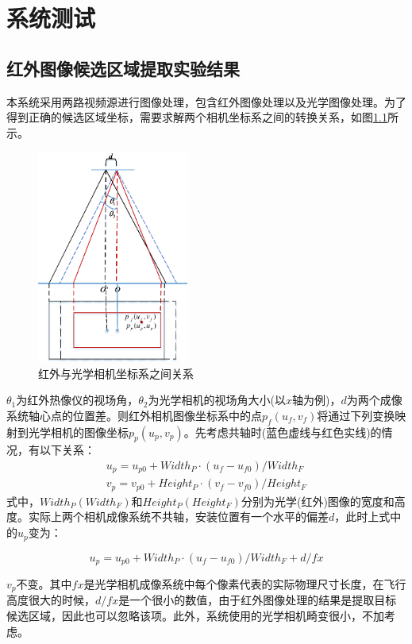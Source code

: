 \chapter{系统测试}
\thispagestyle{fancy}

\section{红外图像候选区域提取实验结果}


本系统采用两路视频源进行图像处理，包含红外图像处理以及光学图像处理。为了得到正确的候选区域坐标，需要求解两个相机坐标系之间的转换关系，如图\ref{红外与光学相机坐标系之间关系}所示。
\begin{figure}[h]
    \centering
    \includegraphics[height=7cm]{figures/红外与光学相机坐标系之间关系.pdf}
    \caption{红外与光学相机坐标系之间关系}\label{红外与光学相机坐标系之间关系}
\end{figure}

$\theta_1$为红外热像仪的视场角，$\theta_2$为光学相机的视场角大小(以$x$轴为例)，$d$为两个成像系统轴心点的位置差。则红外相机图像坐标系中的点$p_f(u_f,v_f)$将通过下列变换映射到光学相机的图像坐标$p_p(u_p,v_p)$。先考虑共轴时(蓝色虚线与红色实线)的情况，有以下关系：	
\begin{gather}
u_p=u_{p0}+Width_P\cdot(u_f-u_{f0})/Width_F\\
v_p=v_{p0}+Height_P\cdot(v_f-v_{f0})/Height_F
\end{gather}
式中，$Width_P(Width_F)$和$Height_P(Height_F)$分别为光学(红外)图像的宽度和高度。实际上两个相机成像系统不共轴，安装位置有一个水平的偏差$d$，此时上式中的$u_p$变为：

\begin{equation}
u_p=u_{p0}+Width_P\cdot(u_f-u_{f0})/Width_F+d/fx
\end{equation}

$v_p$不变。其中$fx$是光学相机成像系统中每个像素代表的实际物理尺寸长度，在飞行高度很大的时候，$d/fx$是一个很小的数值，由于红外图像处理的结果是提取目标候选区域，因此也可以忽略该项。此外，系统使用的光学相机畸变很小，不加考虑。

